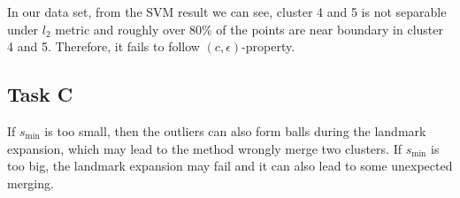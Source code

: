 \documentclass{article}
\begin{document}
  In our data set, from the SVM result we can see, cluster 4 and 5 is not separable under $l_2$ metric and roughly over 80\% of the points are near boundary in cluster 4 and 5. Therefore, it fails to follow $(c, \epsilon)$-property.

\subsection*{Task C}

  If $s_{\min}$ is too small, then the outliers can also form balls during the landmark expansion, which may lead to the method wrongly merge two clusters. If $s_{\min}$ is too big, the landmark expansion may fail and it can also lead to some unexpected merging.
\end{document}
